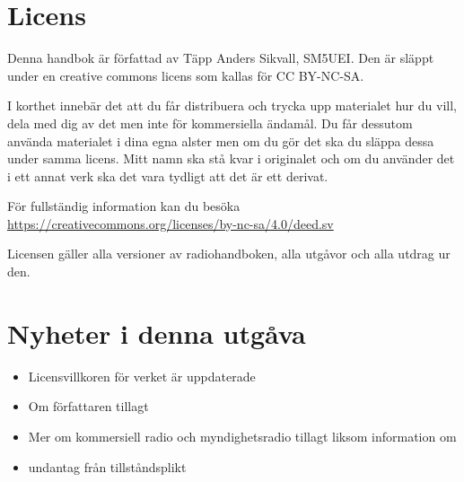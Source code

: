\section*{Licens}

Denna handbok är författad av Täpp Anders Sikvall, SM5UEI. Den är
släppt under en creative commons licens som kallas för CC BY-NC-SA.

I korthet innebär det att du får distribuera och trycka upp materialet
hur du vill, dela med dig av det men inte för kommersiella ändamål. Du
får dessutom använda materialet i dina egna alster men om du gör det
ska du släppa dessa under samma licens. Mitt namn ska stå kvar i
originalet och om du använder det i ett annat verk ska det vara
tydligt att det är ett derivat.

För fullständig information kan du besöka\\
\url{https://creativecommons.org/licenses/by-nc-sa/4.0/deed.sv}

Licensen gäller alla versioner av radiohandboken, alla utgåvor och
alla utdrag ur den.

\clearpage

\section*{Nyheter i denna utgåva}

\begin{itemize}
  \item Licensvillkoren för verket är uppdaterade
  \item Om författaren tillagt
  \item Mer om kommersiell radio och myndighetsradio tillagt liksom information om
  \item undantag från tillståndsplikt
\end{itemize}

\clearpage
